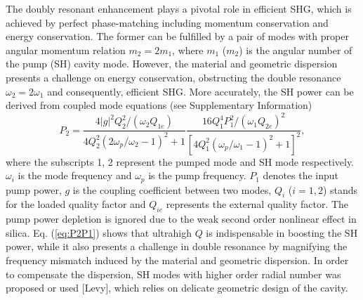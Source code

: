 \documentclass[a4paper,8pt,hyperref, twocolumn]{article}
\begin{document}
The doubly resonant enhancement plays a pivotal role in efficient SHG, which is achieved by perfect phase-matching including momentum conservation and energy conservation.
The former can be fulfilled by a pair of modes with proper angular momentum relation $m_2=2m_1$, where $m_1$ ($m_2$) is the angular number of the pump (SH) cavity mode. 
However, the material and geometric dispersion presents a challenge on energy conservation, obstructing the double resonance $\omega_2=2\omega_1$ and consequently, efficient SHG. 
More accurately, the SH power can be derived from coupled mode equations (see Supplementary Information)%
\begin{equation}
P_2 = \frac{4|g|^2Q_2^2/(\omega_2Q_{1e})}{4Q_2^2(2\omega_p/\omega_2-1)^2+1}\frac{16Q_1^4P_1^2/(\omega_1Q_{2e})^2}{[4Q_1^2(\omega_p/\omega_1-1)^2+1]^2},
\label{eq:P2P1}
\end{equation}
where the subscripts 1, 2 represent the pumped mode and SH mode respectively. $\omega_i$ is the mode frequency and $\omega_p$ is the pump frequency. $P_1$ denotes the input pump power, $g$ is the coupling coefficient between two modes, %
$Q_i$ ($i=1, 2$) stands for the loaded quality factor %
and $Q_{ie}$ represents the external quality factor. The pump power depletion is ignored due to the weak second order nonlinear effect in silica.
Eq. (\ref{eq:P2P1}) shows that ultrahigh $Q$ is indispensable in boosting the SH power, while it also presents a challenge in double resonance by magnifying the frequency mismatch induced by the material and geometric dispersion.
In order to compensate the dispersion, SH modes with higher order radial number was proposed or used  \cite{kozyreff2008whispering}[Levy], which relies on delicate geometric design of the cavity.
\end{document}
